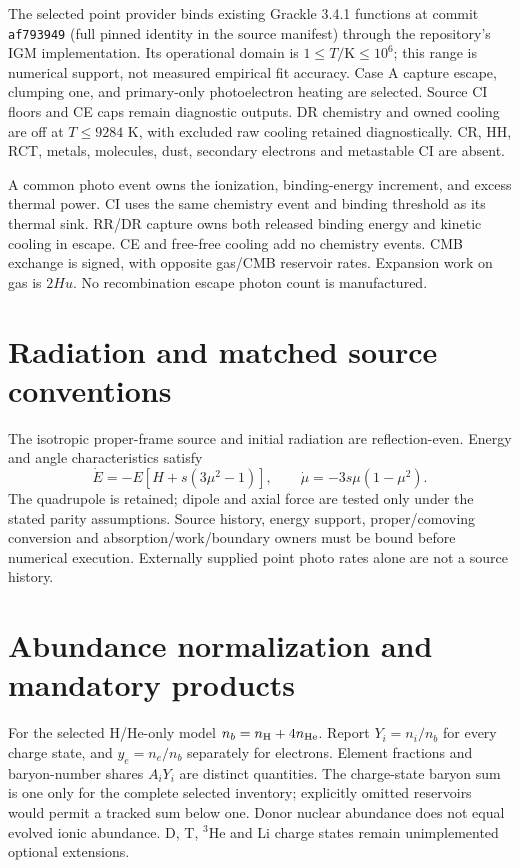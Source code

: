 \documentclass[11pt]{article}
\begin{document}
The selected point provider binds existing Grackle 3.4.1 functions at commit \texttt{af793949} (full pinned identity in the source manifest) through the repository's IGM implementation\cite{grackle}. Its operational domain is $1\le T/\mathrm K\le10^6$; this range is numerical support, not measured empirical fit accuracy. Case A capture escape, clumping one, and primary-only photoelectron heating are selected. Source CI floors and CE caps remain diagnostic outputs. DR chemistry and owned cooling are off at $T\le9284$ K, with excluded raw cooling retained diagnostically. CR, HH, RCT, metals, molecules, dust, secondary electrons and metastable CI are absent.

A common photo event owns the ionization, binding-energy increment, and excess thermal power. CI uses the same chemistry event and binding threshold as its thermal sink. RR/DR capture owns both released binding energy and kinetic cooling in escape. CE and free-free cooling add no chemistry events. CMB exchange is signed, with opposite gas/CMB reservoir rates. Expansion work on gas is $2Hu$. No recombination escape photon count is manufactured.

\section{Radiation and matched source conventions}
The isotropic proper-frame source and initial radiation are reflection-even. Energy and angle characteristics satisfy
\begin{equation}
 \dot E=-E[H+s(3\mu^2-1)],\qquad \dot\mu=-3s\mu(1-\mu^2).
\end{equation}
The quadrupole is retained; dipole and axial force are tested only under the stated parity assumptions. Source history, energy support, proper/comoving conversion and absorption/work/boundary owners must be bound before numerical execution. Externally supplied point photo rates alone are not a source history.

\section{Abundance normalization and mandatory products}
For the selected H/He-only model $n_b=n_{\rm H}+4n_{\rm He}$. Report $Y_i=n_i/n_b$ for every charge state, and $y_e=n_e/n_b$ separately for electrons. Element fractions and baryon-number shares $A_iY_i$ are distinct quantities. The charge-state baryon sum is one only for the complete selected inventory; explicitly omitted reservoirs would permit a tracked sum below one. Donor nuclear abundance does not equal evolved ionic abundance. D, T, $^3$He and Li charge states remain unimplemented optional extensions.
\end{document}
